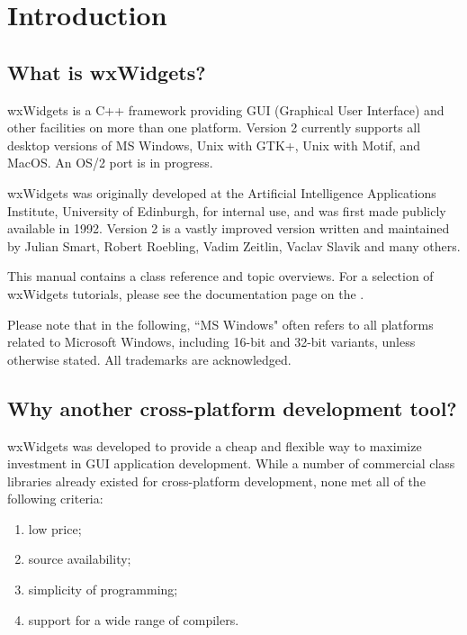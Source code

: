 \chapter{Introduction}\label{introduction}
%
%
\setfooter{\thepage}{}{}{}{}{\thepage}%

\section{What is wxWidgets?}\label{whatis}

wxWidgets is a C++ framework providing GUI (Graphical User
Interface) and other facilities on more than one platform.  Version 2 currently
supports all desktop versions of MS Windows, Unix with GTK+, Unix with Motif,
and MacOS. An OS/2 port is in progress.

wxWidgets was originally developed at the Artificial Intelligence
Applications Institute, University of Edinburgh, for internal use,
and was first made publicly available in 1992.
Version 2 is a vastly improved version written and maintained by
Julian Smart, Robert Roebling, Vadim Zeitlin, Vaclav Slavik and many others.

This manual contains a class reference and topic overviews.
For a selection of wxWidgets tutorials, please see the documentation page on the .

Please note that in the following, ``MS Windows" often refers to all
platforms related to Microsoft Windows, including 16-bit and 32-bit
variants, unless otherwise stated. All trademarks are acknowledged.

\section{Why another cross-platform development tool?}\label{why}

wxWidgets was developed to provide a cheap and flexible way to maximize
investment in GUI application development.  While a number of commercial
class libraries already existed for cross-platform development,
none met all of the following criteria:

\begin{enumerate}\itemsep=0pt
\item low price;
\item source availability;
\item simplicity of programming;
\item support for a wide range of compilers.
\end{enumerate}

